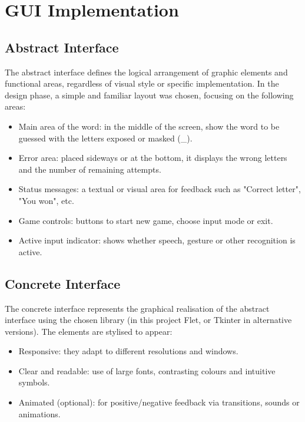 \section{GUI Implementation}
\subsection{Abstract Interface}
The abstract interface defines the logical arrangement of graphic elements and functional areas, regardless of visual style or specific implementation. In the design phase, a simple and familiar layout was chosen, focusing on the following areas:
\begin{itemize}
    \item Main area of the word: in the middle of the screen, show the word to be guessed with the letters exposed or masked (\_).
    \item Error area: placed sideways or at the bottom, it displays the wrong letters and the number of remaining attempts.
    \item Status messages: a textual or visual area for feedback such as "Correct letter", "You won", etc.
    \item Game controls: buttons to start new game, choose input mode or exit.
    \item Active input indicator: shows whether speech, gesture or other recognition is active.
\end{itemize}

\subsection{Concrete Interface}
The concrete interface represents the graphical realisation of the abstract interface using the chosen library (in this project Flet, or Tkinter in alternative versions). The elements are stylised to appear:
\begin{itemize}
    \item Responsive: they adapt to different resolutions and windows.
    \item Clear and readable: use of large fonts, contrasting colours and intuitive symbols.
    \item Animated (optional): for positive/negative feedback via transitions, sounds or animations.
\end{itemize}

